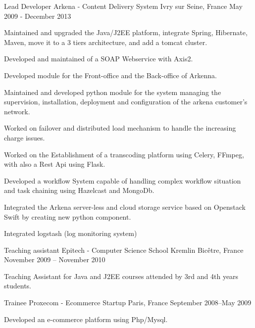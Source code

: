 \begin{cventries}
  \cventry
    {Lead Developer} %
    {Arkena - Content Delivery System} %
    {Ivry sur Seine, France} %
    {May 2009 - December 2013} %
    {
      \begin{cvitems} %
        \item {Maintained and upgraded the Java/J2EE platform, integrate Spring, Hibernate, Maven, move it to a 3 tiers architecture, and add a tomcat cluster.}
        \item {Developed and maintained of a SOAP Webservice with Axis2.}
        \item {Developed module for the Front-office and the Back-office of Arkenna.}
        \item {Maintained and developed python module for the system managing the supervision, installation, deployment and configuration of the arkena customer’s network.}
        \item {Worked on failover and distributed load mechanism to handle the increasing charge issues.}
        \item {Worked on the Establishment of a transcoding platform using Celery, FFmpeg, with also a Rest Api using Flask.}
        \item {Developed a workflow System capable of handling complex workflow situation and task chaining using Hazelcast and MongoDb.}
        \item {Integrated the Arkena server-less and cloud storage service based on Openstack Swift by creating new python component.}
        \item {Integrated logstash (log monitoring system)}
      \end{cvitems}
    }

  \cventry
    {Teaching assistant} %
    {Epitech - Computer Science School} %
    {Kremlin Bicêtre, France} %
    {November 2009 – November 2010} %
    {
      \begin{cvitems} %
        \item {Teaching Assistant for Java and J2EE courses attended by 3rd and 4th years students.}
      \end{cvitems}
    }

  \cventry
    {Trainee} %
    {Proxecom - Ecommerce Startup} %
    {Paris, France} %
    {September 2008–May 2009} %
    {
      \begin{cvitems} %
        \item {Developed an e-commerce platform using Php/Mysql.}
      \end{cvitems}
    }


\end{cventries}
